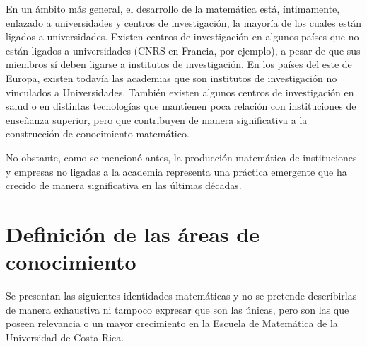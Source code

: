 En un ámbito más general, el desarrollo de la matemática está, íntimamente, enlazado a universidades y centros de investigación, la mayoría de los cuales están ligados a universidades. Existen centros de investigación en algunos países que no están ligados a universidades (CNRS en Francia, por ejemplo), a pesar de que sus miembros sí deben ligarse a institutos de investigación. En los países del este de Europa, existen todavía las academias que son institutos de investigación no vinculados a Universidades. También existen algunos centros de investigación en salud o en distintas tecnologías que mantienen poca relación con instituciones de enseñanza superior, pero que contribuyen de manera significativa a la construcción de conocimiento matemático. 

No obstante, como se mencionó antes, la producción matemática de instituciones y empresas no ligadas a la academia representa una práctica emergente que ha crecido de manera significativa en las últimas décadas. 



\section{Definición de las áreas de conocimiento}


Se presentan las siguientes identidades matemáticas y no se pretende describirlas de manera exhaustiva ni tampoco expresar que son las únicas, pero son las que poseen relevancia o un mayor crecimiento en la Escuela de Matemática de la Universidad de Costa Rica. 

